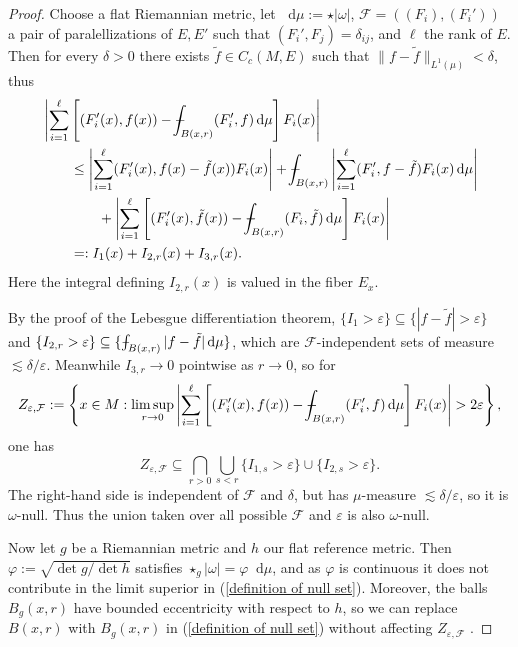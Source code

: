 \documentclass[final,12pt, leqno]{brownthesis}
\newcommand*\dif{\mathop{}\!\mathrm{d}}
\theoremstyle{definition}
\numberwithin{equation}{section}
\def\Xint#1{\mathchoice
{\XXint\displaystyle\textstyle{#1}}%
{\XXint\textstyle\scriptstyle{#1}}%
{\XXint\scriptstyle\scriptscriptstyle{#1}}%
{\XXint\scriptscriptstyle\scriptscriptstyle{#1}}%
\!\int}
\def\XXint#1#2#3{{\setbox0=\hbox{$#1{#2#3}{\int}$ }
\vcenter{\hbox{$#2#3$ }}\kern-.6\wd0}}
\def\dashint{\Xint-}
\begin{document}
\begin{proof}
Choose a flat Riemannian metric, let $\dif \mu := \star |\omega|$, $\mathcal F = ((F_i), (F_i'))$ a pair of paralellizations of $E, E'$ such that $(F_i', F_j) = \delta_{ij}$, and $\ell$ the rank of $E$.
Then for every $\delta > 0$ there exists $\tilde f \in C_c(M, E)$ such that $\|f - \tilde f\|_{L^1(\mu)} < \delta$, thus
\begin{align*}
&\left|\sum_{i=1}^\ell \left[(F_i'(x), f(x)) - \dashint_{B(x, r)} (F_i', f) \dif \mu\right] F_i(x)\right| \\
&\qquad \leq \left|\sum_{i=1}^\ell (F_i'(x), f(x) - \tilde f(x)) F_i(x)\right| + \dashint_{B(x, r)} \left|\sum_{i=1}^\ell (F_i', f - \tilde f)F_i(x) \dif \mu \right| \\
&\qquad \qquad + \left|\sum_{i=1}^\ell \left[(F_i'(x), \tilde f(x)) - \dashint_{B(x, r)} (F_i, \tilde f) \dif \mu\right] F_i(x)\right| \\
&\qquad =: I_1(x) + I_{2, r}(x) + I_{3, r}(x).
\end{align*}
Here the integral defining $I_{2, r}(x)$ is valued in the fiber $E_x$.

By the proof of the Lebesgue differentiation theorem, $\{I_1 > \varepsilon\} \subseteq \{|f - \tilde f| > \varepsilon\}$ and $\{I_{2, r} > \varepsilon\} \subseteq \{\dashint_{B(x, r)} |f - \tilde f|\dif \mu\}$, which are $\mathcal F$-independent sets of measure $\lesssim \delta/\varepsilon$.
Meanwhile $I_{3, r} \to 0$ pointwise as $r \to 0$, so for
\begin{equation}\label{definition of null set}
Z_{\varepsilon, \mathcal F} := \left\{x \in M: \limsup_{r \to 0} \left|\sum_{i=1}^\ell \left[(F_i'(x), f(x)) - \dashint_{B(x, r)} (F_i', f) \dif \mu\right] F_i(x)\right| > 2\varepsilon\right\},
\end{equation}
one has
$$Z_{\varepsilon, \mathcal F} \subseteq \bigcap_{r > 0}\bigcup_{s <r} \{I_{1, s} > \varepsilon\} \cup \{I_{2, s} > \varepsilon\}.$$
The right-hand side is independent of $\mathcal F$ and $\delta$, but has $\mu$-measure $\lesssim \delta/\varepsilon$, so it is $\omega$-null.
Thus the union taken over all possible $\mathcal F$ and $\varepsilon$ is also $\omega$-null.

Now let $g$ be a Riemannian metric and $h$ our flat reference metric.
Then $\varphi := \sqrt{\det g/\det h}$ satisfies $\star_g|\omega| = \varphi \dif \mu$, and as $\varphi$ is continuous it does not contribute in the limit superior in (\ref{definition of null set}).
Moreover, the balls $B_g(x, r)$ have bounded eccentricity with respect to $h$, so we can replace $B(x, r)$ with $B_g(x, r)$ in (\ref{definition of null set}) without affecting $Z_{\varepsilon, \mathcal F}$ \cite[Chapter 3, Corollary 1.7]{stein2009real}.
\end{proof}
\end{document}
